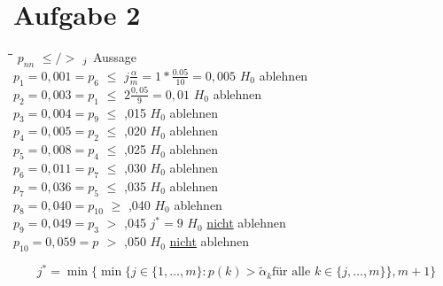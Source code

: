 \documentclass[10pt,a4paper]{article}
\begin{document}
\section*{Aufgabe 2}
\begin{tabbing}
	\hspace{90pt}\=\hspace{30pt}\=\hspace{130pt}\=\kill
	\(p_{nn}\)\> \(\leq / >\)   \> \(\title{\alpha}_{j}\)  \> Aussage\\	
	\(p_{1} = 0,001 = p_{6}\)	\> \(\leq\)	\> \(j\frac{\alpha}{m} = 1 *\frac{0.05}{10} = 0,005\)  \> \(H_0\) ablehnen \\	
	\(p_{2} = 0,003 = p_{1}\)	\> \(\leq\)	\> \(2 \frac{0,05}{9} = 0,01\)  \>  \(H_0\) ablehnen\\	
	\(p_{3} = 0,004 = p_{9}\)	\> \(\leq\)	,015	\> \(H_0\) ablehnen \\	
	\(p_{4} = 0,005 = p_{2}\)	\> \(\leq\)	,020	\> \(H_0\) ablehnen \\	
	\(p_{5} = 0,008 = p_{4}\)	\> \(\leq\)	,025	\> \(H_0\) ablehnen\\	
	\(p_{6} = 0,011 = p_{7}\)	\> \(\leq\) ,030	\> \(H_0\) ablehnen\\	
	\(p_{7} = 0,036 = p_{5}\)	\> \(\leq\) ,035	\>  \(H_0\) ablehnen\\	
	\(p_{8} = 0,040 = p_{10}\)	\>\(\geq\)  ,040	\>\(H_0\) ablehnen\\	
	\(p_{9} = 0,049 = p_{3}\)	\> \(>\) 	,045 \(j^* = 9\)	\> \(H_0\) \underline{nicht} ablehnen \\	
	\(p_{10} = 0,059 = p_{}\)	\> \(>\) 	,050	\>  \(H_0\) \underline{nicht} ablehnen\\		
\end{tabbing} 	
\[j^* = \min\{ \min\{ j \in \{1, \ldots, m\} : p(k) > \tilde{\alpha}_k \text{für alle } k \in \{j, \ldots,m\} \}, m+1\}\]
\end{document}
